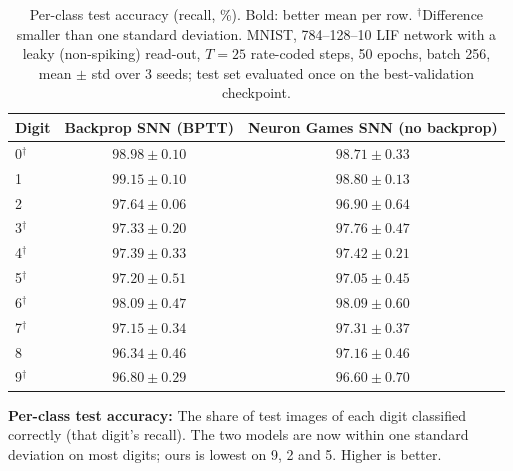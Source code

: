 \documentclass{article}
\begin{document}
\begin{table}[H]
\centering
\small
\caption{Per-class test accuracy (recall, \%). Bold: better mean per row. $^\dagger$Difference smaller than one standard deviation. MNIST, 784--128--10 LIF network with a leaky (non-spiking) read-out, $T=25$ rate-coded steps, 50 epochs, batch 256, mean $\pm$ std over 3 seeds; test set evaluated once on the best-validation checkpoint.}
\label{tab:t1-per-class}
\begin{tabular}{lcc}
\toprule
Digit & Backprop SNN (BPTT) & Neuron Games SNN (no backprop) \\
\midrule
0$^\dagger$ & $\boldsymbol{98.98 \pm 0.10}$ & $98.71 \pm 0.33$ \\
1 & $\boldsymbol{99.15 \pm 0.10}$ & $98.80 \pm 0.13$ \\
2 & $\boldsymbol{97.64 \pm 0.06}$ & $96.90 \pm 0.64$ \\
3$^\dagger$ & $97.33 \pm 0.20$ & $\boldsymbol{97.76 \pm 0.47}$ \\
4$^\dagger$ & $97.39 \pm 0.33$ & $\boldsymbol{97.42 \pm 0.21}$ \\
5$^\dagger$ & $\boldsymbol{97.20 \pm 0.51}$ & $97.05 \pm 0.45$ \\
6$^\dagger$ & $98.09 \pm 0.47$ & $98.09 \pm 0.60$ \\
7$^\dagger$ & $97.15 \pm 0.34$ & $\boldsymbol{97.31 \pm 0.37}$ \\
8 & $96.34 \pm 0.46$ & $\boldsymbol{97.16 \pm 0.46}$ \\
9$^\dagger$ & $\boldsymbol{96.80 \pm 0.29}$ & $96.60 \pm 0.70$ \\
\bottomrule
\end{tabular}
\end{table}

{\small
\noindent\textbf{Per-class test accuracy:} The share of test images of each digit classified correctly (that
digit's recall). The two models are now within one standard deviation on most digits; ours is lowest on 9, 2 and
5. Higher is better.
}
\end{document}
